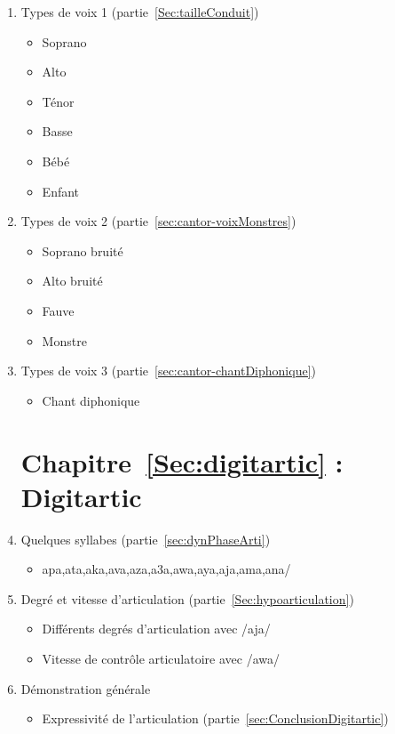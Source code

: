 \begin{enumerate}
\item    Types de voix 1 (partie~\ref{Sec:tailleConduit})
\label{fav:types-voix-1}
		\begin{itemize}
        \item Soprano
       \item Alto
        \item Ténor
        \item Basse
        \item Bébé
        \item Enfant
        \end{itemize}
\item   Types de voix 2 (partie~\ref{sec:cantor-voixMonstres})
\label{fav:types-voix-2}
		\begin{itemize}        
        \item Soprano bruité
        \item Alto bruité
        \item Fauve
        \item Monstre
         \end{itemize}
\item Types de voix 3 (partie~\ref{sec:cantor-chantDiphonique})
\label{fav:types-voix-3}
		\begin{itemize}        
        \item Chant diphonique
		\end{itemize}
\newpage
\section*{Chapitre~\ref{Sec:digitartic} : Digitartic}

 \item   Quelques syllabes (partie~\ref{sec:dynPhaseArti})
 \label{fav:syllabes}
 	\begin{itemize}
 		\item apa,ata,aka,ava,aza,a3a,awa,aya,aja,ama,ana/ 
 	\end{itemize}
 \item  Degré et vitesse d'articulation (partie~\ref{Sec:hypoarticulation})
 \label{fav:degreesArti}
 		\begin{itemize}        
        \item Différents degrés d'articulation avec /aja/ 
        \item Vitesse de contrôle articulatoire avec /awa/
        \end{itemize}
 \item   Démonstration générale 
 \label{fav:demo-expressivite}
 		\begin{itemize}
 		\item Expressivité de l'articulation (partie~\ref{sec:ConclusionDigitartic})
 		\end{itemize}


\end{enumerate}
